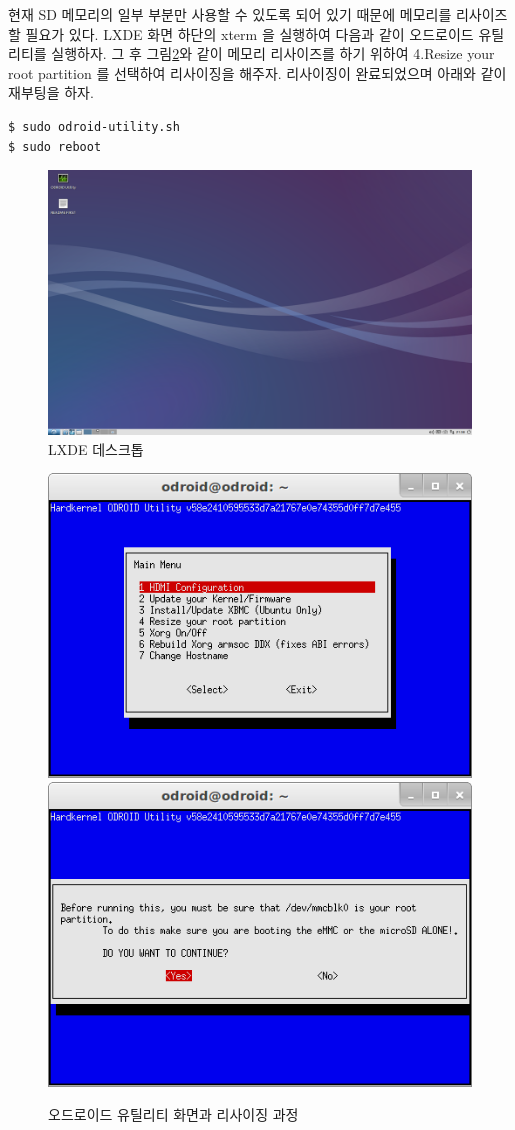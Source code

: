 현재 SD 메모리의 일부 부분만 사용할 수 있도록 되어 있기 때문에 메모리를 리사이즈 할 필요가 있다. LXDE 화면 하단의 xterm 을 실행하여 다음과 같이 오드로이드 유틸리티를 실행하자. 그 후 그림\ref{fig:odroid_utility}와 같이 메모리 리사이즈를 하기 위하여 4.Resize your root partition 를 선택하여 리사이징을 해주자. 리사이징이 완료되었으며 아래와 같이 재부팅을 하자.

\vspace{\baselineskip}
\begin{lstlisting}[language=ROS]
$ sudo odroid-utility.sh 
$ sudo reboot 
\end{lstlisting}

\begin{figure}[h]
\centering\includegraphics[width=0.7\columnwidth]{pictures/chapter3/odroid_LXDE.png}
\caption{LXDE 데스크톱}
\label{fig:lxde}
\end{figure}

\begin{figure}[h]
\centering
\includegraphics[width=0.49\columnwidth]{pictures/chapter3/odroid_option1.png}
\includegraphics[width=0.49\columnwidth]{pictures/chapter3/odroid_option2.png}
\caption{오드로이드 유틸리티 화면과 리사이징 과정}
\label{fig:odroid_utility}
\end{figure}

